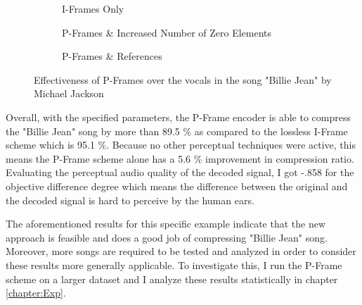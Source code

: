 \begin{figure}[ht]
\centering
\begin{subfigure}{0.30\textwidth}
    
    \caption{I-Frames Only}
    \label{fig:unmodified_3sec}
\end{subfigure}
\hfill
\begin{subfigure}{0.32\textwidth}
    
    \caption{P-Frames \& Increased Number of Zero Elements}
    \label{fig:saved_3sec}
\end{subfigure}
\hfill
\begin{subfigure}{0.32\textwidth}
    
    \caption{P-Frames \& References}
    \label{fig:ref_3sec}
\end{subfigure}
\caption{Effectiveness of P-Frames over the vocals in the song "Billie Jean" by Michael Jackson}
\label{fig:billie_jean_3sec}
\end{figure}

Overall, with the specified parameters, the P-Frame encoder is able to compress the "Billie Jean" song by more than 89.5 \% as compared to the lossless I-Frame scheme which is 95.1 \%. Because no other perceptual techniques were active, this means the P-Frame scheme alone has a 5.6 \% improvement in compression ratio. Evaluating the perceptual audio quality of the decoded signal, I got -.858 for the objective difference degree which means the difference between the original and the decoded signal is hard to perceive by the human ears.

The aforementioned results for this specific example indicate that the new approach is feasible and does a good job of compressing "Billie Jean"  song. Moreover, more songs are required to be tested and analyzed in order to consider these results more generally applicable. To investigate this, I run the P-Frame scheme on a larger dataset and I analyze these results statistically in chapter \ref{chapter:Exp}.